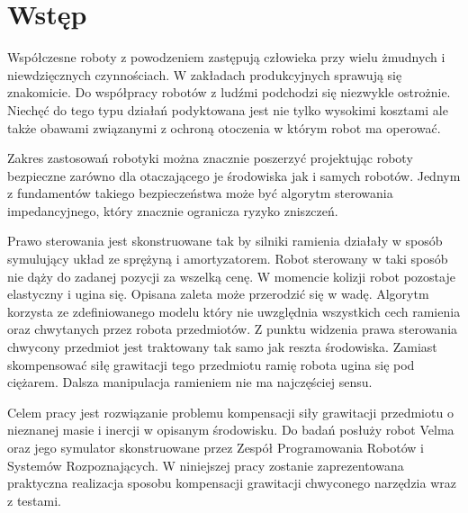 
\chapter{Wstęp\label{chap:wstep}}

	Współczesne roboty z powodzeniem zastępują człowieka przy wielu żmudnych i niewdzięcznych czynnościach.  W zakładach produkcyjnych sprawują się znakomicie. Do współpracy robotów z ludźmi podchodzi się niezwykle ostrożnie. Niechęć do tego typu działań podyktowana jest nie tylko wysokimi kosztami ale także obawami związanymi z ochroną otoczenia w którym robot ma operować.
	
	Zakres zastosowań robotyki można znacznie poszerzyć projektując roboty bezpieczne zarówno dla otaczającego je środowiska jak i samych robotów. Jednym z fundamentów takiego bezpieczeństwa może być algorytm sterowania impedancyjnego, który znacznie ogranicza ryzyko zniszczeń. 
	
	Prawo sterowania jest skonstruowane tak by silniki ramienia działały w sposób symulujący układ ze sprężyną i amortyzatorem. Robot sterowany w taki sposób nie dąży do zadanej pozycji za wszelką cenę. W momencie kolizji robot pozostaje elastyczny i ugina się. Opisana zaleta może przerodzić się w wadę. Algorytm korzysta ze zdefiniowanego modelu który nie uwzględnia wszystkich cech ramienia oraz chwytanych przez robota przedmiotów. Z punktu widzenia prawa sterowania chwycony przedmiot jest traktowany tak samo jak reszta środowiska. Zamiast skompensować siłę grawitacji tego przedmiotu ramię robota ugina się pod ciężarem. Dalsza manipulacja ramieniem nie ma najczęściej sensu. 

	Celem pracy jest rozwiązanie problemu kompensacji siły grawitacji przedmiotu o nieznanej masie i inercji w opisanym środowisku. 
	Do badań posłuży robot Velma oraz jego symulator skonstruowane przez Zespół Programowania Robotów i Systemów Rozpoznających. W niniejszej pracy zostanie zaprezentowana praktyczna realizacja sposobu kompensacji grawitacji chwyconego narzędzia wraz z testami.
